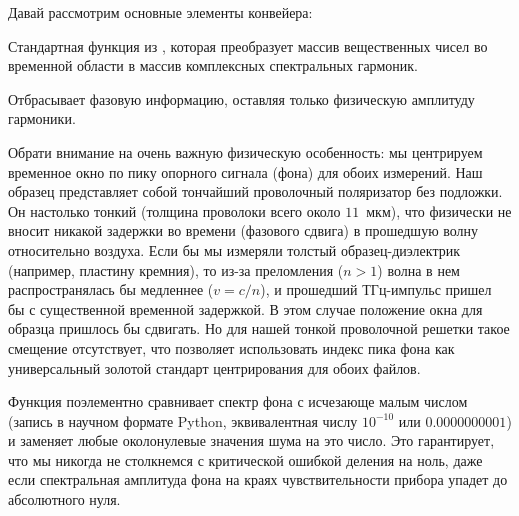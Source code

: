 Давай рассмотрим основные элементы конвейера:
\begin{syntaxdesc}
    \item[Вычисление БПФ \mycode{rfft(E)} (строка 13 в Листинге~\ref{lst:compute_spectrum})] Стандартная функция из , которая преобразует массив вещественных чисел  во временной области в массив комплексных спектральных гармоник.
    \item[Извлечение амплитуды \mycode{np.abs(spectrum_complex)} (строка 16 в Листинге~\ref{lst:compute_spectrum})] Отбрасывает фазовую информацию, оставляя только физическую амплитуду гармоники.
    \item[Центрирование по опорному сигналу \mycode{peak_idx = find_peak_center(E_bg_clean)} (строка 14 в Листинге~\ref{lst:calculate_transmission})] Обрати внимание на очень важную физическую особенность: мы центрируем временное окно по пику опорного сигнала (фона) для обоих измерений. Наш образец представляет собой тончайший проволочный поляризатор без подложки. Он настолько тонкий (толщина проволоки всего около $11$~мкм), что физически не вносит никакой задержки во времени (фазового сдвига) в прошедшую волну относительно воздуха. Если бы мы измеряли толстый образец-диэлектрик (например, пластину кремния), то из-за преломления ($n > 1$) волна в нем распространялась бы медленнее ($v = c/n$), и прошедший ТГц-импульс пришел бы с существенной временной задержкой. В этом случае положение окна для образца пришлось бы сдвигать. Но для нашей тонкой проволочной решетки такое смещение отсутствует, что позволяет использовать индекс пика фона  как универсальный золотой стандарт центрирования для обоих файлов.
    \item[Безопасное деление \mycode{np.maximum(spec_bg, 1e-10)} (строка 26 в Листинге~\ref{lst:calculate_transmission})] Функция  поэлементно сравнивает спектр фона с исчезающе малым числом  (запись в научном формате Python, эквивалентная числу $10^{-10}$ или $0.0000000001$) и заменяет любые околонулевые значения шума на это число. Это гарантирует, что мы никогда не столкнемся с критической ошибкой деления на ноль, даже если спектральная амплитуда фона на краях чувствительности прибора упадет до абсолютного нуля.
\end{syntaxdesc}

